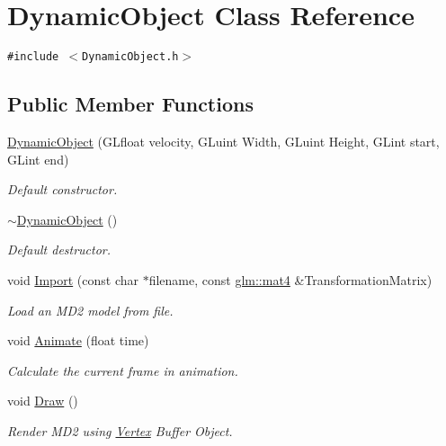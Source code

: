 \hypertarget{class_dynamic_object}{
\section{DynamicObject Class Reference}
\label{class_dynamic_object}
}
{\tt \#include $<$DynamicObject.h$>$}

\subsection*{Public Member Functions}
\begin{CompactItemize}
\item 
\hyperlink{class_dynamic_object_ded38f8769ea3994d03742f79f72ee07}{DynamicObject} (GLfloat velocity, GLuint Width, GLuint Height, GLint start, GLint end)
\begin{CompactList}\small\item\em Default constructor. \item\end{CompactList}\item 
\hyperlink{class_dynamic_object_149b612e1f0288b115178874bd0cba93}{$\sim$DynamicObject} ()
\begin{CompactList}\small\item\em Default destructor. \item\end{CompactList}\item 
void \hyperlink{class_dynamic_object_051bb345c635c976355223d3e5586bf9}{Import} (const char $\ast$filename, const \hyperlink{group__core__types_g7dcd2365c2e368e6af5b7adeb6a9c8df}{glm::mat4} \&TransformationMatrix)
\begin{CompactList}\small\item\em Load an MD2 model from file. \item\end{CompactList}\item 
void \hyperlink{class_dynamic_object_c22d80000f1cb3aeb9837224e54f23a3}{Animate} (float time)
\begin{CompactList}\small\item\em Calculate the current frame in animation. \item\end{CompactList}\item 
void \hyperlink{class_dynamic_object_2730ff294914d7fe0a66bad8378bcda8}{Draw} ()
\begin{CompactList}\small\item\em Render MD2 using \hyperlink{class_vertex}{Vertex} Buffer Object. \item\end{CompactList}\item 

\end{CompactItemize}
